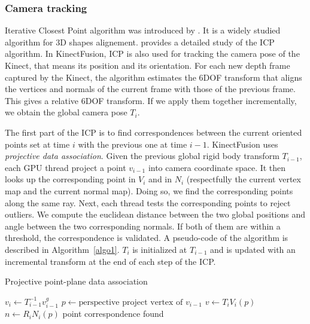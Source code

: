 \documentclass[12pt]{article}
\begin{document}
\subsubsection{Camera tracking}
Iterative Closest Point algorithm was introduced by \cite{ICP1}. It is a widely studied algorithm for 3D shapes alignement. \cite{ICP2} provides a detailed study of the ICP algorithm. In KinectFusion, ICP is also used for tracking the camera pose of the Kinect, that means its position and its orientation. For each new depth frame captured by the Kinect, the algorithm estimates the 6DOF transform that aligns the vertices and normals of the current frame with those of the previous frame. This gives a relative 6DOF transform. If we apply them together incrementally, we obtain the global camera pose $T_i$.

The first part of the ICP is to find correspondences between the current oriented points set at time $i$ with the previous one at time $i-1$. KinectFusion uses \textit{projective data association}. Given the previous global rigid body transform $T_{i-1}$, each GPU thread project a point $v_{i-1}$ into camera coordinate space. It then looks up the corresponding point in $V_i$ and in $N_i$ (respectfully the current vertex map and the current normal map). Doing so, we find the corresponding points along the same ray. Next, each thread tests the corresponding points to reject outliers. We compute the euclidean distance between the two global positions and angle between the two corresponding normals. If both of them are within a threshold, the correspondence is validated. A pseudo-code of the algorithm is described in Algorithm~\ref{algo1}. $T_i$ is initialized at $T_{i-1}$ and is updated with an incremental transform at the end of each step of the ICP.

\begin{algorithm}
\caption{Projective point-plane data association}\label{algo1}
\begin{algorithmic}[1]
  \State $v_i \gets T_{i-1}^{-1}v_{i-1}^g$
  \State $p \gets \text{perspective project vertex of } v_{i-1}$
    \State $v \gets T_iV_i(p)$
    \State $n \gets R_iN_i(p)$
      \State point correspondence found
      \EndIf
    \EndIf
  \EndIf
\EndFor
\end{algorithmic}
\end{algorithm}
\end{document}
